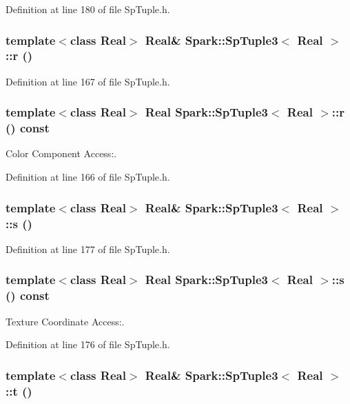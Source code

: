 Definition at line 180 of file Sp\-Tuple.h.
\subsubsection{\setlength{\rightskip}{0pt plus 5cm}template$<$class Real$>$ Real\& {\bf Spark::Sp\-Tuple3}$<$ Real $>$::r ()\hspace{0.3cm}{\tt  [inline]}}\label{classSpark_1_1SpTuple3_a9}


Definition at line 167 of file Sp\-Tuple.h.
\subsubsection{\setlength{\rightskip}{0pt plus 5cm}template$<$class Real$>$ Real {\bf Spark::Sp\-Tuple3}$<$ Real $>$::r () const\hspace{0.3cm}{\tt  [inline]}}\label{classSpark_1_1SpTuple3_a8}


Color Component Access:. 

Definition at line 166 of file Sp\-Tuple.h.
\subsubsection{\setlength{\rightskip}{0pt plus 5cm}template$<$class Real$>$ Real\& {\bf Spark::Sp\-Tuple3}$<$ Real $>$::s ()\hspace{0.3cm}{\tt  [inline]}}\label{classSpark_1_1SpTuple3_a15}


Definition at line 177 of file Sp\-Tuple.h.
\subsubsection{\setlength{\rightskip}{0pt plus 5cm}template$<$class Real$>$ Real {\bf Spark::Sp\-Tuple3}$<$ Real $>$::s () const\hspace{0.3cm}{\tt  [inline]}}\label{classSpark_1_1SpTuple3_a14}


Texture Coordinate Access:. 

Definition at line 176 of file Sp\-Tuple.h.
\subsubsection{\setlength{\rightskip}{0pt plus 5cm}template$<$class Real$>$ Real\& {\bf Spark::Sp\-Tuple3}$<$ Real $>$::t ()\hspace{0.3cm}{\tt  [inline]}}\label{classSpark_1_1SpTuple3_a17}


